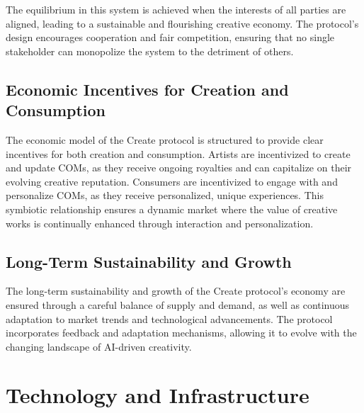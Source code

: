 \documentclass[12pt,a4paper]{article}
\begin{document}
The equilibrium in this system is achieved when the interests of all parties are aligned, leading to a sustainable and flourishing creative economy. The protocol's design encourages cooperation and fair competition, ensuring that no single stakeholder can monopolize the system to the detriment of others.

\subsection{Economic Incentives for Creation and Consumption}

The economic model of the Create protocol is structured to provide clear incentives for both creation and consumption. Artists are incentivized to create and update COMs, as they receive ongoing royalties and can capitalize on their evolving creative reputation. Consumers are incentivized to engage with and personalize COMs, as they receive personalized, unique experiences. This symbiotic relationship ensures a dynamic market where the value of creative works is continually enhanced through interaction and personalization.

\subsection{Long-Term Sustainability and Growth}

The long-term sustainability and growth of the Create protocol's economy are ensured through a careful balance of supply and demand, as well as continuous adaptation to market trends and technological advancements. The protocol incorporates feedback and adaptation mechanisms, allowing it to evolve with the changing landscape of AI-driven creativity.

\noindent{}

\pagebreak

\section{Technology and Infrastructure}
\end{document}
